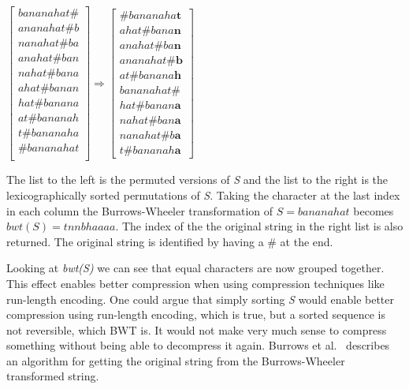 \begin{center}
$\begin{bmatrix}
	bananahat\#\\
	ananahat\#b\\
	nanahat\#ba\\
	anahat\#ban\\
	nahat\#bana\\
	ahat\#banan\\
	hat\#banana\\
	at\#bananah\\
	t\#bananaha\\
	\#bananahat\\
\end{bmatrix} \Rightarrow
\begin{bmatrix}
	\#bananaha\textbf{t}\\
	ahat\#bana\textbf{n}\\
	anahat\#ba\textbf{n}\\
	ananahat\#\textbf{b}\\
	at\#banana\textbf{h}\\
	bananahat\#\\
	hat\#banan\textbf{a}\\
	nahat\#ban\textbf{a}\\
	nanahat\#b\textbf{a}\\
	t\#bananah\textbf{a}
\end{bmatrix}$
\end{center}

The list to the left is the permuted versions of \textit{S} and the list to the right is the lexicographically sorted permutations of \textit{S}.
Taking the character at the last index in each column the Burrows-Wheeler transformation of $S=bananahat$ becomes $bwt(S) = tnnbhaaaa$. The index of the the original string in the right list is also returned. 
The original string is identified by having a \# at the end.

Looking at \textit{bwt(S)} we can see that equal characters are now grouped together.
This effect enables better compression when using compression techniques like run-length encoding.
One could argue that simply sorting \textit{S} would enable better compression using run-length encoding, which is true, but a sorted sequence is not reversible, which BWT is.
It would not make very much sense to compress something without being able to decompress it again.
Burrows et al.~\citep[Section~2]{BWToriginalArticle} describes an algorithm for getting the original string from the Burrows-Wheeler transformed string.

